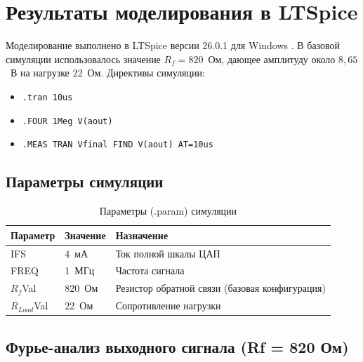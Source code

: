 \documentclass[a4paper, 12pt]{article}
\begin{document}
\section{Результаты моделирования в LTSpice}

Моделирование выполнено в LTSpice версии 26.0.1 для Windows \cite{LTspice}.
В базовой симуляции использовалось значение \(R_f = 820\)~Ом, дающее
амплитуду около \(8{,}65\)~В на нагрузке 22~Ом.
Директивы симуляции:
\begin{itemize}
  \item \texttt{.tran 10us}
  \item \texttt{.FOUR 1Meg V(aout)}
  \item \texttt{.MEAS TRAN Vfinal FIND V(aout) AT=10us}
\end{itemize}

\subsection{Параметры симуляции}

\begin{table}[H]
\centering
\caption{Параметры (.param) симуляции}
\label{tab:params}
\begin{tabular}{@{}lll@{}}
\toprule
\textbf{Параметр} & \textbf{Значение} & \textbf{Назначение} \\
\midrule
IFS   & 4~мА   & Ток полной шкалы ЦАП \\
FREQ  & 1~МГц  & Частота сигнала \\
\(R_f\)Val & 820~Ом & Резистор обратной связи (базовая конфигурация) \\
\(R_{Load}\)Val & 22~Ом & Сопротивление нагрузки \\
\bottomrule
\end{tabular}
\end{table}

\subsection{Фурье-анализ выходного сигнала (Rf = 820 Ом)}
\end{document}
